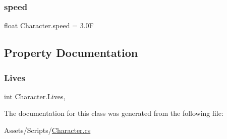\mbox{\label{class_character_a34ba4bab0f4e03bc819698826f483572}} 
\subsubsection{\texorpdfstring{speed}{speed}}
{\footnotesize\ttfamily float Character.\+speed = 3.\+0F}



\subsection{Property Documentation}
\mbox{\label{class_character_a9aa02060768a4818a7be5439d4b2b34b}} 
\subsubsection{\texorpdfstring{Lives}{Lives}}
{\footnotesize\ttfamily int Character.\+Lives\hspace{0.3cm}{\ttfamily [get]}, {\ttfamily [set]}}



The documentation for this class was generated from the following file\+:\begin{DoxyCompactItemize}
\item 
Assets/\+Scripts/\mbox{\hyperlink{_character_8cs}{Character.\+cs}}\end{DoxyCompactItemize}
